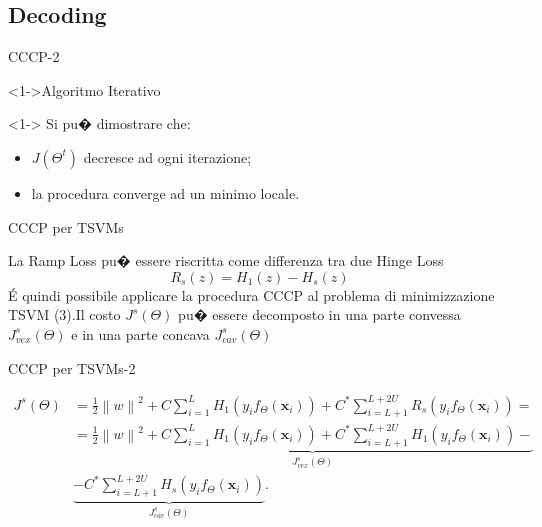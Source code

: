 \documentclass[mathserif]{beamer}
\begin{document}
\subsection{Decoding}
\begin{frame}{CCCP-2}
\begin{block}<1->{Algoritmo Iterativo}
\end{block}


\begin{block}<1-> {}
Si pu� dimostrare che:
\begin{itemize}
	\item<1->  $J(\Theta^t)$ decresce ad ogni iterazione;
	\item<1-> la procedura converge ad un minimo locale.
\end{itemize}
\end{block}
\end{frame}


\begin{frame}{CCCP per TSVMs}
\begin{block}{}
La Ramp Loss pu� essere riscritta come differenza tra due Hinge Loss
\begin{equation}
	R_s(z)=H_1(z)-H_s(z)
\end{equation}
\'E quindi possibile applicare la procedura CCCP al problema di minimizzazione TSVM (3).Il costo $J^s(\Theta)$ pu� essere decomposto in una parte convessa $J^s_{vex}(\Theta)$ e in una parte concava $J^s_{cav}(\Theta)$
\end{block}
\end{frame}

\begin{frame}{CCCP per TSVMs-2}
\begin{block}{}
\begin{equation}
\begin{split}
J^s(\Theta)& =\frac{1}{2}\left\|w\right\|^2+C\sum_{i=1}^{L}H_1(y_if_\Theta(\textbf{x}_i))+C^*\sum_{i=L+1}^{L+2U}R_s(y_if_\Theta(\textbf{x}_i))=\\
 & =\underbrace{\frac{1}{2}\left\|w\right\|^2+C\sum_{i=1}^{L}H_1(y_if_\Theta(\textbf{x}_i))+C^*\sum_{i=L+1}^{L+2U}H_1(y_if_\Theta(\textbf{x}_i))-}_{J^s_{vex}(\Theta)}\\
 &\underbrace{-C^*\sum_{i=L+1}^{L+2U}H_s(y_if_\Theta(\textbf{x}_i))}_{J^s_{cav}(\Theta)}.
\end{split}
\end{equation}
\end{block}
\end{frame}
\end{document}
